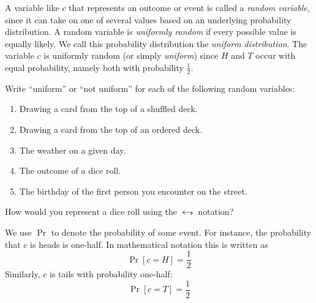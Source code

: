 A variable like $c$ that represents an outcome or event is called a \emph{random 
variable}, since it can take on one of several values based on an underlying 
probability distribution. A random variable is \emph{uniformly random} if every possible 
value is equally likely. We call this probability distribution the 
\emph{uniform distribution}. The variable $c$ is uniformly random (or simply \emph{uniform})
since $H$ and $T$ occur with equal probability, namely both with probability 
$\frac{1}{2}$. 


\begin{exercise}
    Write ``uniform'' or ``not uniform'' for each of the following random variables:
    \renewcommand{\labelenumi}{(\alph{enumi})} 
    \begin{enumerate}
        \item Drawing a card from the top of a shuffled deck.
        \item Drawing a card from the top of an ordered deck.
        \item The weather on a given day.
        \item The outcome of a dice roll.
        \item The birthday of the first person you encounter on the street.
    \end{enumerate}
\end{exercise}

\begin{exercise}
    How would you represent a dice roll using the $\hskip2.3pt{\gets\!\!\mbox{\tiny${\$}$\normalsize}}\,$ notation?
\end{exercise}

We use $\Pr$ to denote the probability of some event. For instance, the 
probability that $c$ is heads is one-half. In mathematical notation this
is written as
\[
    \Pr[c=H] = \frac{1}{2}
\]
Similarly, $c$ is tails with probability one-half:
\[
    \Pr[c=T] = \frac{1}{2}
\]

